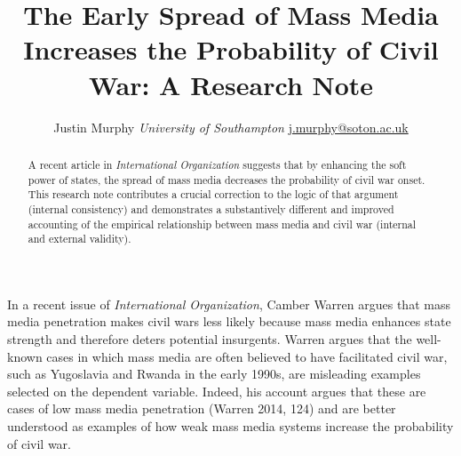 \documentclass[11pt,article,oneside]{memoir}
\title{The Early Spread of Mass Media Increases the Probability of Civil War: A
Research Note}
\author{\Large Justin Murphy\vspace{0.05in} \newline\normalsize\emph{University of Southampton} \newline\footnotesize \url{j.murphy@soton.ac.uk}\vspace*{0.2in}\newline }
\date{}
\begin{document}
  
\setsansfont[Mapping=tex-text]{Gill Sans} 
\setmonofont[Mapping=tex-text,Scale=0.8]{Consolas}

\doublespacing


\maketitle



\vspace{-4ex}
\begin{abstract}

\noindent A recent article in \emph{International Organization} suggests that by
enhancing the soft power of states, the spread of mass media decreases
the probability of civil war onset. This research note contributes a
crucial correction to the logic of that argument (internal consistency)
and demonstrates a substantively different and improved accounting of
the empirical relationship between mass media and civil war (internal
and external validity).

\end{abstract}

\newpage


In a recent issue of \emph{International Organization}, Camber Warren
argues that mass media penetration makes civil wars less likely because
mass media enhances state strength and therefore deters potential
insurgents. Warren argues that the well-known cases in which mass media
are often believed to have facilitated civil war, such as Yugoslavia and
Rwanda in the early 1990s, are misleading examples selected on the
dependent variable. Indeed, his account argues that these are cases of
low mass media penetration (Warren 2014, 124) and are better understood
as examples of how weak mass media systems increase the probability of
civil war.
\end{document}
